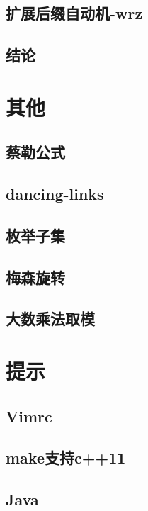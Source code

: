 \documentclass[titlepage,a4paper,10pt]{article}
\begin{document}
\begin{multicols}{2}
\begin{spacing}{0.8}
			\subsection{扩展后缀自动机-wrz}
				
			\subsection{结论}
				
		\section{其他}
			\subsection{蔡勒公式}
				
			\subsection{dancing-links}
				
			\subsection{枚举子集}
				
			\subsection{梅森旋转}
				
			\subsection{大数乘法取模}
				
		\section{提示}
			\subsection{Vimrc}
				
			\subsection{make支持c++11}
				
			\subsection{Java}
				

\end{spacing}
\end{multicols}
\end{document}
